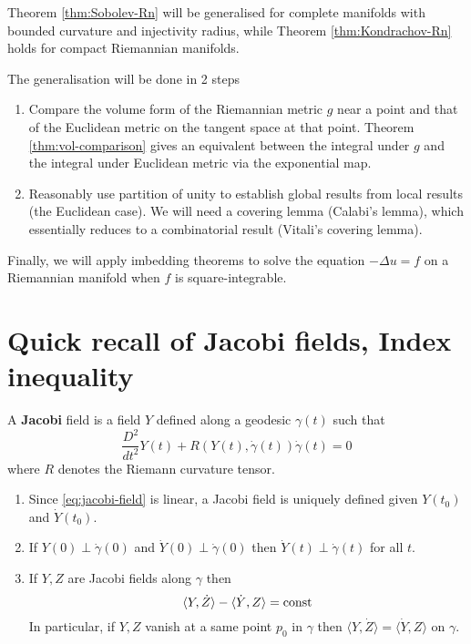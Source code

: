 Theorem \ref{thm:Sobolev-Rn} will be generalised for complete manifolds with bounded curvature and
injectivity radius, while Theorem \ref{thm:Kondrachov-Rn} holds for compact Riemannian manifolds.

The generalisation will be done in 2 steps
\begin{enumerate}
\item Compare the volume form of the Riemannian metric \(g\) near a point and
that of the Euclidean metric on the tangent space at that point. Theorem
\ref{thm:vol-comparison} gives an equivalent between the integral under \(g\) and the integral
under Euclidean metric via the exponential map.
\item Reasonably use partition of unity to establish global results from local results (the
Euclidean case). We will need a covering lemma (Calabi's lemma), which essentially reduces to a
combinatorial result (Vitali's covering lemma).
\end{enumerate}

Finally, we will apply imbedding theorems to solve the equation \(-\Delta u = f\) on a
Riemannian manifold when \(f\) is square-integrable.
\section{Quick recall of Jacobi fields, Index inequality}
\label{sec:orgc838712}
\begin{definition}
A \textbf{Jacobi} field is a field \(Y\) defined along a geodesic \(\gamma(t)\) such that
\begin{equation}
\label{eq:jacobi-field}
 \frac{D^2}{dt^2}Y(t) + R(Y(t),\dot\gamma(t))\dot\gamma(t) = 0
\end{equation}
where \(R\) denotes the Riemann curvature tensor.
\end{definition}

\begin{remark}
\label{rem:obvious-jacobi}
\begin{enumerate}
\item Since \eqref{eq:jacobi-field} is linear, a Jacobi field is uniquely defined given \(Y(t_0)\) and \(\dot Y(t_0)\).
\item If \(Y(0) \perp \dot\gamma(0)\) and \(\dot Y(0) \perp \dot\gamma(0)\) then \(\dot Y(t)
   \perp \dot\gamma(t)\) for all \(t\).
\item If \(Y,Z\) are Jacobi fields along \(\gamma\) then 
\[
    \langle Y, \dot Z \rangle - \langle \dot Y, Z \rangle = \mathop{\rm const }\nolimits
   \]
In particular, if \(Y,Z\) vanish at a same point \(p_0\) in \(\gamma\) then
\(\langle Y,\dot Z \rangle = \langle \dot Y, Z \rangle\) on \(\gamma\).
\end{enumerate}
\end{remark}


